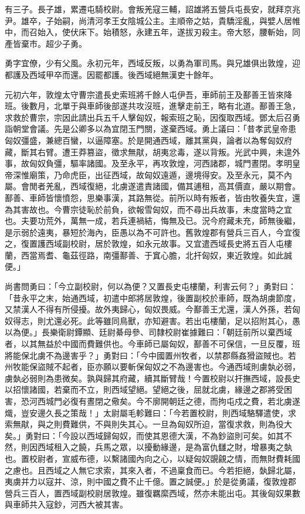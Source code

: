 \begin{pinyinscope}
有三子。長子雄，累遷屯騎校尉。會叛羌寇三輔，詔雄將五營兵屯長安，就拜京兆尹。雄卒，子始嗣，尚清河孝王女陰城公主。主順帝之姑，貴驕淫亂，與嬖人居帷中，而召始入，使伏床下。始積怒，永建五年，遂拔刃殺主。帝大怒，腰斬始，同產皆棄巿。超少子勇。

勇字宜僚，少有父風。永初元年，西域反叛，以勇為軍司馬。與兄雄俱出敦煌，迎都護及西域甲卒而還。因罷都護。後西域絕無漢吏十餘年。

元初六年，敦煌太守曹宗遣長史索班將千餘人屯伊吾，車師前王及鄯善王皆來降班。後數月，北單于與車師後部遂共攻沒班，進擊走前王，略有北道。鄯善王急，求救於曹宗，宗因此請出兵五千人擊匈奴，報索班之恥，因復取西域。鄧太后召勇詣朝堂會議。先是公卿多以為宜閉玉門關，遂棄西域。勇上議曰：「昔孝武皇帝患匈奴彊盛，兼總百蠻，以逼障塞。於是開通西域，離其黨與，論者以為奪匈奴府藏，斷其右臂。遭王莽篡盜，徵求無猒，胡夷忿毒，遂以背叛。光武中興，未遑外事，故匈奴負彊，驅率諸國。及至永平，再攻敦煌，河西諸郡，城門晝閉。孝明皇帝深惟廟策，乃命虎臣，出征西域，故匈奴遠遁，邊境得安。及至永元，莫不內屬。會閒者羌亂，西域復絕，北虜遂遣責諸國，備其逋租，高其價直，嚴以期會。鄯善、車師皆懷憤怨，思樂事漢，其路無從。前所以時有叛者，皆由牧養失宜，還為其害故也。今曹宗徒恥於前負，欲報雪匈奴，而不尋出兵故事，未度當時之宜也。夫要功荒外，萬無一成，若兵連禍結，悔無及已。況今府藏未充，師無後繼，是示弱於遠夷，暴短於海內，臣愚以為不可許也。舊敦煌郡有營兵三百人，今宜復之，復置護西域副校尉，居於敦煌，如永元故事。又宜遣西域長史將五百人屯樓蘭，西當焉耆、龜茲徑路，南彊鄯善、于窴心膽，北扞匈奴，東近敦煌。如此誠便。」

尚書問勇曰：「今立副校尉，何以為便？又置長史屯樓蘭，利害云何？」勇對曰：「昔永平之末，始通西域，初遣中郎將居敦煌，後置副校於車師，既為胡虜節度，又禁漢人不得有所侵擾。故外夷歸心，匈奴畏威。今鄯善王尤還，漢人外孫，若匈奴得志，則尤還必死。此等雖同鳥獸，亦知避害。若出屯樓蘭，足以招附其心，愚以為便。」長樂衛尉鐔顯、廷尉綦母參、司隸校尉崔據難曰：「朝廷前所以棄西域者，以其無益於中國而費難供也。今車師已屬匈奴，鄯善不可保信，一旦反覆，班將能保北虜不為邊害乎？」勇對曰：「今中國置州牧者，以禁郡縣姦猾盜賊也。若州牧能保盜賊不起者，臣亦願以要斬保匈奴之不為邊害也。今通西域則虜埶必弱，虜埶必弱則為患微矣。孰與歸其府藏，續其斷臂哉！今置校尉以扞撫西域，設長史以招懷諸國，若棄而不立，則西域望絕。望絕之後，屈就北虜，緣邊之郡將受困害，恐河西城門必復有晝閉之儆矣。今不廓開朝廷之德，而拘屯戍之費，若北虜遂熾，豈安邊久長之策哉！」太尉屬毛軫難曰：「今若置校尉，則西域駱驛遣使，求索無猒，與之則費難供，不與則失其心。一旦為匈奴所迫，當復求救，則為役大矣。」勇對曰：「今設以西域歸匈奴，而使其恩德大漢，不為鈔盜則可矣。如其不然，則因西域租入之饒，兵馬之眾，以擾動緣邊，是為富仇讎之財，增暴夷之埶也。置校尉者，宣威布德，以繫諸國內向之心，以疑匈奴覬覦之情，而無財費耗國之慮也。且西域之人無它求索，其來入者，不過稟食而已。今若拒絕，埶歸北屬，夷虜并力以寇并、涼，則中國之費不止千億。置之誠便。」於是從勇議，復敦煌郡營兵三百人，置西域副校尉居敦煌。雖復羈縻西域，然亦未能出屯。其後匈奴果數與車師共入寇鈔，河西大被其害。


\end{pinyinscope}
